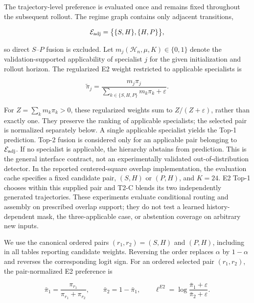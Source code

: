 \documentclass{article}
\begin{document}
The trajectory-level preference is evaluated once and remains fixed
throughout the subsequent rollout. The regime graph contains only adjacent transitions,


\begin{equation}
  \mathcal E_{\rm adj}
  =
  \bigl\{
    \{S,H\},
    \{H,P\}
  \bigr\},
  \label{eq:app_adjacency}
\end{equation}


so direct $S$--$P$ fusion is excluded.
Let
$m_j(\mathcal H_n,\mu,K)\in\{0,1\}$
denote the validation-supported applicability of specialist $j$ for the
given initialization and rollout horizon.
The regularized E2 weight restricted to applicable specialists is


\begin{equation}
  \widetilde\pi_j
  =
  \frac{
    m_j\pi_j
  }{
    \sum_{k\in\{S,H,P\}}m_k\pi_k+\varepsilon
  }.
  \label{eq:app_masked_e2}
\end{equation}


For $Z=\sum_k m_k\pi_k>0$, these regularized weights sum to $Z/(Z+\varepsilon)$, rather than exactly one. They preserve the ranking of applicable specialists; the selected pair is normalized separately below. A single applicable specialist yields the Top-1 prediction.
Top-2 fusion is considered only for an applicable pair belonging to
$\mathcal E_{\rm adj}$.
If no specialist is applicable, the hierarchy abstains from prediction. This is the general interface contract, not an experimentally validated out-of-distribution detector. In the reported centered-square overlap implementation, the evaluation cache specifies a fixed candidate pair, $(S,H)$ or $(P,H)$, and $K=24$. E2 Top-1 chooses within this supplied pair and T2-C blends its two independently generated trajectories. These experiments evaluate conditional routing and assembly on prescribed overlap support; they do not test a learned history-dependent mask, the three-applicable case, or abstention coverage on arbitrary new inputs.

We use the canonical ordered pairs $(r_1,r_2)=(S,H)$ and $(P,H)$, including in all tables reporting candidate weights. Reversing the order replaces $\alpha$ by $1-\alpha$ and reverses the corresponding logit sign. For an ordered selected pair $(r_1,r_2)$, the pair-normalized E2
preference is


\begin{equation}
  \bar\pi_1
  =
  \frac{\pi_{r_1}}
       {\pi_{r_1}+\pi_{r_2}},
  \qquad
  \bar\pi_2
  =
  1-\bar\pi_1,
  \qquad
  \ell^{E2}
  =
  \log
  \frac{\bar\pi_1+\varepsilon}
       {\bar\pi_2+\varepsilon}.
  \label{eq:app_pair_logit}
\end{equation}
\end{document}
